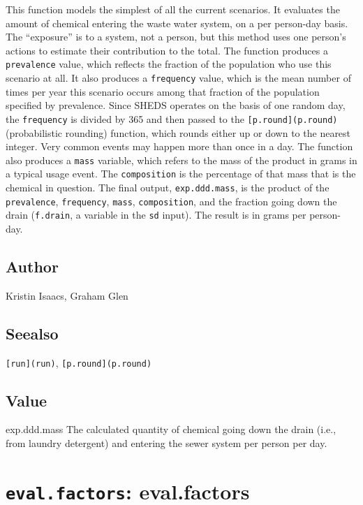 \documentclass[
]{article}
\begin{document}
This function models the simplest of all the current scenarios. It
evaluates the amount of chemical entering the waste water system, on a
per person-day basis. The ``exposure'' is to a system, not a person, but
this method uses one person's actions to estimate their contribution to
the total. The function produces a \texttt{prevalence} value, which
reflects the fraction of the population who use this scenario at all. It
also produces a \texttt{frequency} value, which is the mean number of
times per year this scenario occurs among that fraction of the
population specified by prevalence. Since SHEDS operates on the basis of
one random day, the \texttt{frequency} is divided by 365 and then passed
to the \texttt{{[}p.round{]}(p.round)} (probabilistic rounding)
function, which rounds either up or down to the nearest integer. Very
common events may happen more than once in a day. The function also
produces a \texttt{mass} variable, which refers to the mass of the
product in grams in a typical usage event. The \texttt{composition} is
the percentage of that mass that is the chemical in question. The final
output, \texttt{exp.ddd.mass}, is the product of the
\texttt{prevalence}, \texttt{frequency}, \texttt{mass},
\texttt{composition}, and the fraction going down the drain
(\texttt{f.drain}, a variable in the \texttt{sd} input). The result is
in grams per person-day.

\hypertarget{author-14}{%
\subsection{Author}\label{author-14}}

Kristin Isaacs, Graham Glen

\hypertarget{seealso-10}{%
\subsection{Seealso}\label{seealso-10}}

\texttt{{[}run{]}(run)}, \texttt{{[}p.round{]}(p.round)}

\hypertarget{value-13}{%
\subsection{Value}\label{value-13}}

exp.ddd.mass The calculated quantity of chemical going down the drain
(i.e., from laundry detergent) and entering the sewer system per person
per day.

\hypertarget{eval.factors-eval.factors}{%
\section{\texorpdfstring{\texttt{eval.factors}:
eval.factors}{eval.factors: eval.factors}}\label{eval.factors-eval.factors}}
\end{document}
